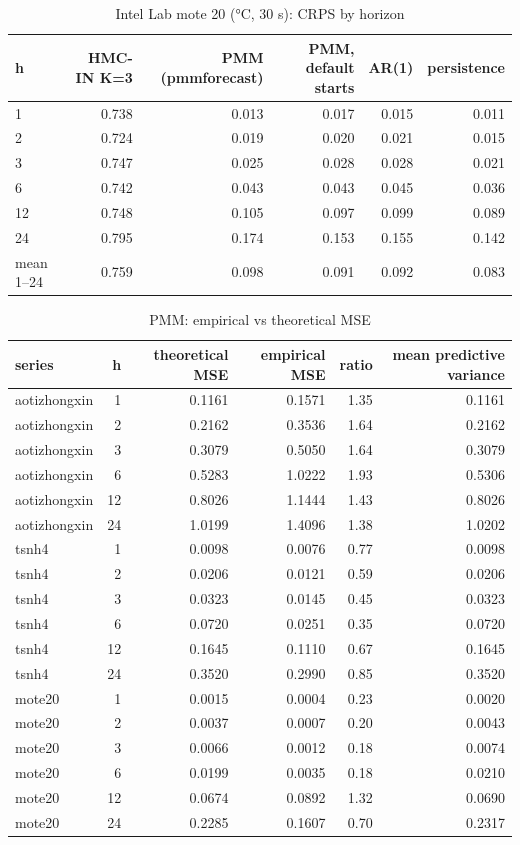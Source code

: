 \begin{table}[ht]\centering\small
\caption{Intel Lab mote 20 (°C, 30 s): CRPS by horizon}
\begin{tabular}{lrrrrr}
\hline
h & HMC-IN K=3 & PMM (pmmforecast) & PMM, default starts & AR(1) & persistence \\ \hline
1 & 0.738 & 0.013 & 0.017 & 0.015 & 0.011 \\
2 & 0.724 & 0.019 & 0.020 & 0.021 & 0.015 \\
3 & 0.747 & 0.025 & 0.028 & 0.028 & 0.021 \\
6 & 0.742 & 0.043 & 0.043 & 0.045 & 0.036 \\
12 & 0.748 & 0.105 & 0.097 & 0.099 & 0.089 \\
24 & 0.795 & 0.174 & 0.153 & 0.155 & 0.142 \\
mean 1–24 & 0.759 & 0.098 & 0.091 & 0.092 & 0.083 \\
\hline\end{tabular}\end{table}

\begin{table}[ht]\centering\small
\caption{PMM: empirical vs theoretical MSE}
\begin{tabular}{lrrrrr}
\hline
series & h & theoretical MSE & empirical MSE & ratio & mean predictive variance \\ \hline
aotizhongxin & 1 & 0.1161 & 0.1571 & 1.35 & 0.1161 \\
aotizhongxin & 2 & 0.2162 & 0.3536 & 1.64 & 0.2162 \\
aotizhongxin & 3 & 0.3079 & 0.5050 & 1.64 & 0.3079 \\
aotizhongxin & 6 & 0.5283 & 1.0222 & 1.93 & 0.5306 \\
aotizhongxin & 12 & 0.8026 & 1.1444 & 1.43 & 0.8026 \\
aotizhongxin & 24 & 1.0199 & 1.4096 & 1.38 & 1.0202 \\
tsnh4 & 1 & 0.0098 & 0.0076 & 0.77 & 0.0098 \\
tsnh4 & 2 & 0.0206 & 0.0121 & 0.59 & 0.0206 \\
tsnh4 & 3 & 0.0323 & 0.0145 & 0.45 & 0.0323 \\
tsnh4 & 6 & 0.0720 & 0.0251 & 0.35 & 0.0720 \\
tsnh4 & 12 & 0.1645 & 0.1110 & 0.67 & 0.1645 \\
tsnh4 & 24 & 0.3520 & 0.2990 & 0.85 & 0.3520 \\
mote20 & 1 & 0.0015 & 0.0004 & 0.23 & 0.0020 \\
mote20 & 2 & 0.0037 & 0.0007 & 0.20 & 0.0043 \\
mote20 & 3 & 0.0066 & 0.0012 & 0.18 & 0.0074 \\
mote20 & 6 & 0.0199 & 0.0035 & 0.18 & 0.0210 \\
mote20 & 12 & 0.0674 & 0.0892 & 1.32 & 0.0690 \\
mote20 & 24 & 0.2285 & 0.1607 & 0.70 & 0.2317 \\
\hline\end{tabular}\end{table}

